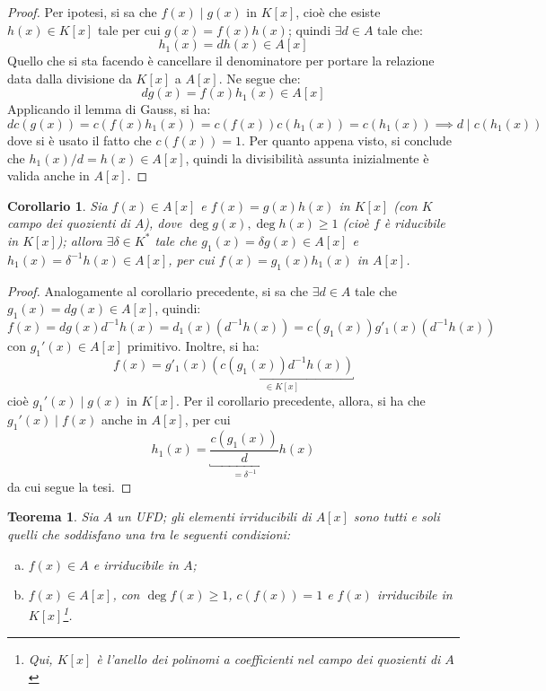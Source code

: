 \documentclass[12pt]{scrartcl}
\theoremstyle{style}
\newtheorem{teorema}{Teorema}[section]
\newtheorem{corollario}{Corollario}[teorema]
\numberwithin{equation}{subsection}
\begin{document}
	\begin{proof}
		Per ipotesi, si sa che $f(x)  \mid g(x)$ in $K[x]$, cio\`e che esiste $h(x) \in K[x]$ tale per cui $g(x) = f(x) h(x)$; quindi $\exists d \in A$ tale che:
		\[
			h_1(x) = dh(x) \in A[x]
		\] 
		Quello che si sta facendo \`e cancellare il denominatore per portare la relazione data dalla divisione da $K[x]$ a $A[x]$.
		Ne segue che:
		\[
			dg(x) = f(x) h_1(x) \in A[x]
		\] 
		Applicando il lemma di Gauss, si ha:
		\[
		dc(g(x)) = c(f(x)h_1(x)) = c(f(x)) c(h_1(x)) = c(h_1(x)) \implies d  \mid c(h_1(x))
		\] 
		dove si \`e usato il fatto che $c(f(x)) = 1$. 
		Per quanto appena visto, si conclude che $h_1(x) / d = h(x) \in A[x]$, quindi la divisibilit\`a assunta inizialmente \`e valida anche in $A[x]$.
	\end{proof}
\begin{corollario}\label{corufd2}
	Sia $f(x) \in A[x]$ e $f(x) = g(x) h(x) $ in $K[x]$ (con $K$ campo dei quozienti di $A$), dove $\operatorname{deg} g(x) , \operatorname{deg} h(x) \ge 1$ (cio\`e $f$ \`e riducibile in $K[x]$); allora $\exists \delta \in K^*$ tale che $g_1(x) = \delta g(x) \in A[x]$ e $h_1(x) = \delta ^{-1}h(x)\in A[x]$, per cui $f(x) = g_1(x) h_1(x)$ in $A[x]$.
\end{corollario}
	\begin{proof}
		Analogamente al corollario precedente, si sa che $\exists d \in A$ tale che $g_1(x) = dg(x) \in A[x]$, quindi:
		\[
		f(x) = dg(x) d^{-1}h(x) = d_1(x) \left(d^{-1} h(x)\right) = c(g_1(x)) g'_1(x) (d^{-1}h(x))
		\] 
		con $g_1'(x) \in A[x] $ primitivo.
		Inoltre, si ha:
		\[
			f(x) = g'_1(x) \underbracket{\left(c(g_1(x)) d^{-1}h(x)\right) }_{\in K[x]} 
		\] 
		cio\`e $g_1'(x)  \mid g(x)$ in $K[x]$.
		Per il corollario precedente, allora, si ha che $g_1'(x)  \mid f(x)$ anche in $A[x]$, per cui 
		\[
			h_1(x) = \underbracket{\frac{c(g_1(x))}{d}}_{=\delta ^{-1}} h(x)
		\] 
		 da cui segue la tesi.
	\end{proof}
\begin{teorema}
	Sia $A$ un UFD; gli elementi irriducibili di $A[x]$ sono tutti e soli quelli che soddisfano una tra le seguenti condizioni:
	\begin{enumerate}[(a).]
		\item $f(x) \in A$ e irriducibile in $A$;
		\item $f(x) \in A[x]$, con $\operatorname{deg} f(x) \ge 1$, $c(f(x)) = 1$ e $f(x)$ irriducibile in $K[x]$\footnote{Qui, $K[x]$ \`e l'anello dei polinomi a coefficienti nel campo dei quozienti di $A$}.
	\end{enumerate}
\end{teorema}
\end{document}
